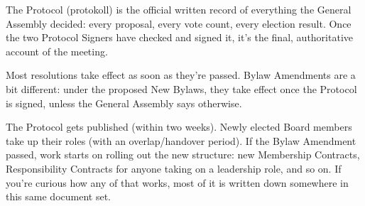 \documentclass{../../../Common/Latex/Templates/rapport}
\begin{document}
The Protocol (protokoll) is the official written record of everything the General Assembly decided: every proposal, every vote count, every election result. Once the two Protocol Signers have checked and signed it, it's the final, authoritative account of the meeting.

Most resolutions take effect as soon as they're passed. Bylaw Amendments are a bit different: under the proposed New Bylaws, they take effect once the Protocol is signed, unless the General Assembly says otherwise.

The Protocol gets published (within two weeks). Newly elected Board members take up their roles (with an overlap/handover period). If the Bylaw Amendment passed, work starts on rolling out the new structure: new Membership Contracts, Responsibility Contracts for anyone taking on a leadership role, and so on. If you're curious how any of that works, most of it is written down somewhere in this same document set.
\end{document}
